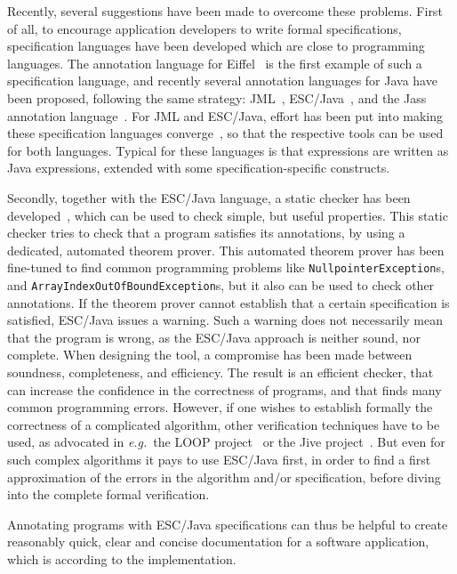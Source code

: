 \documentclass[a4paper]{llncs}
\begin{document}
Recently, several suggestions have been made to overcome these
problems. First of all, to encourage application developers to write
formal specifications, specification languages have been developed
which are close to programming languages. The annotation language for
Eiffel~\cite{Meyer97} is the first example of such a specification
language, and recently several annotation languages for Java have been
proposed, following the same strategy:
JML~\cite{LeavensBR99}, ESC/Java~\cite{ESCJavaUrl}, and
the Jass annotation language~\cite{JassUrl}. For JML and ESC/Java,
effort has been put into making these specification languages
converge~\cite{EscJmlDiff}, so that the respective tools can be used
for both languages. Typical for these languages is that
expressions are written as Java expressions, extended with some
specification-specific constructs.

Secondly, together with the ESC/Java language, a static checker has
been developed~\cite{ESCJavaUrl}, which can be used to check simple,
but useful properties. This static checker tries to check that a
program satisfies its annotations, by using a dedicated, automated
theorem prover. This automated theorem prover has been fine-tuned to
find common programming problems like
\texttt{Null\-pointer\-Exception}s, and
\texttt{Array\-Index\-Out\-Of\-Bound\-Exception}s, but it also can be
used to check other annotations. If the theorem prover cannot
establish that a certain specification is satisfied, ESC/Java issues a
warning. Such a warning does not necessarily mean that the program is
wrong, as the ESC/Java approach is neither sound, nor complete. When
designing the tool, a compromise has been made between soundness,
completeness, and efficiency. The result is an efficient checker, that
can increase the confidence in the correctness of programs, and that
finds many common programming errors. However, if one wishes to
establish formally the correctness of a complicated algorithm, other
verification techniques have to be used, as advocated in
\emph{e.g.}~the LOOP project~\cite{LOOPUrl} or the Jive
project~\cite{MeyerP00}. But even for such complex algorithms it pays
to use ESC/Java first, in order to find a first approximation
of the errors in the algorithm and/or specification, before diving
into the complete formal verification.

Annotating programs with ESC/Java specifications can thus be helpful
to create reasonably quick, clear and concise documentation for
a software application, which is according to the implementation.
\end{document}
